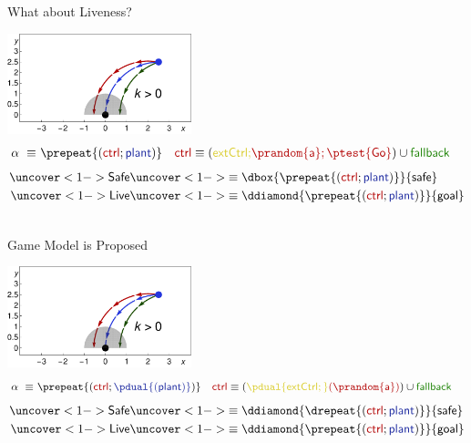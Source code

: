 \documentclass[slidestop,aspectratio=169]{beamer}
\newcommand{\avar}{{\sf a}\xspace}
\newcommand{\ctrl}{\textsf{ctrl}\xspace}
\newcommand{\plant}{\textsf{plant}\xspace}
\newcommand{\fallback}{\textsf{\upshape fallback}\xspace}
\newcommand{\extCtrl}{\textsf{\upshape extCtrl}\xspace}
\theoremstyle{plain}
\theoremstyle{definition}
\theoremstyle{remark}
\newcommand{\ctrlcolor}[1]{{\color{vred}{#1}}}
\newcommand{\extCtrlcolor}[1]{{\color{myyellow}{#1}}}
\newcommand{\fallbackcolor}[1]{{\color{vgreen}{#1}}}
\newcommand{\plantcolor}[1]{{\color{vblue}{#1}}}
\begin{document}
\begin{frame}[t]{What about Liveness?}
\noindent
\begin{center}
\includegraphics[width=0.4\textwidth]{graphics/fig-ode2.pdf}\\%
{\small\begin{align*}
\alpha~\equiv~& \prepeat{(\ctrlcolor{\ctrl}; \plantcolor{\plant})}\ \ \ \ctrlcolor{\ctrl} \equiv  (\extCtrlcolor{\extCtrl;} \ctrlcolor{\prandom{\avar}; \ptest{\admiss}}) \cup \fallbackcolor{\fallback}
\end{align*}}%
\begin{align*}
\uncover<1->{\textsf{Safe}} &\uncover<1->{\equiv \dbox{\prepeat{(\ctrlcolor{\ctrl};\plantcolor{\plant})}}{\textsf{safe}}}\\%
\uncover<1->{\textsf{Live}} &\uncover<1->{\equiv \ddiamond{\prepeat{(\ctrlcolor{\ctrl};\plantcolor{\plant})}}{\textsf{goal}}}\\
\phantom{\textsf{Win}}  &\phantom{\equiv \ddiamond{\prepeat{(\ctrlcolor{\ctrl};\plantcolor{\plant};\ptest{\textsf{safe}})}}{\textsf{goal}}}%
\end{align*}
\end{center}
\end{frame}


\begin{frame}[t]{Game Model is Proposed}
\noindent
\begin{center}
\includegraphics[width=0.4\textwidth]{graphics/fig-ode2.pdf}\\
{\small\begin{align*}
\alpha~\equiv~& \prepeat{(\ctrlcolor{\ctrl}; \plantcolor{\pdual{(\plant)}})}\ \ \ \ctrlcolor{\ctrl} \equiv  (\extCtrlcolor{\pdual{\extCtrl;}} \ctrlcolor{(\prandom{\avar})}) \cup \fallbackcolor{\fallback}
\end{align*}}%
\begin{align*}
\uncover<1->{\textsf{Safe}} &\uncover<1->{\equiv \ddiamond{\drepeat{(\ctrlcolor{\ctrl};\plantcolor{\plant})}}{\textsf{safe}}}\\
\uncover<1->{\textsf{Live}} &\uncover<1->{\equiv \ddiamond{\prepeat{(\ctrlcolor{\ctrl};\plantcolor{\plant})}}{\textsf{goal}}}\\
\phantom{\textsf{Win}}  &\phantom{\equiv \ddiamond{\prepeat{(\ctrlcolor{\ctrl};\plantcolor{\plant};\ptest{\textsf{safe}})}}{\textsf{goal}}}%
\end{align*}
\end{center}
\end{frame}
\end{document}
